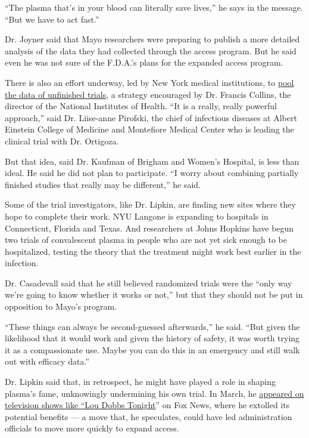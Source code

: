 ``The plasma that's in your blood can literally save lives,'' he says in
the message. ``But we have to act fast.''

Dr. Joyner said that Mayo researchers were preparing to publish a more
detailed analysis of the data they had collected through the access
program. But he said even he was not sure of the F.D.A.'s plans for the
expanded access program.

There is also an effort underway, led by New York medical institutions,
to
\href{https://med.nyu.edu/departments-institutes/population-health/divisions-sections-centers/biostatistics/research/continuous-monitoring-pooled-international-trials-convalescent-plasma-covid19-hospitalized-patients}{pool
the data of unfinished trials}, a strategy encouraged by Dr. Francis
Collins, the director of the National Institutes of Health. ``It is a
really, really powerful approach,'' said Dr. Liise-anne Pirofski, the
chief of infectious diseases at Albert Einstein College of Medicine and
Montefiore Medical Center who is leading the clinical trial with Dr.
Ortigoza.

But that idea, said Dr. Kaufman of Brigham and Women's Hospital, is less
than ideal. He said he did not plan to participate. ``I worry about
combining partially finished studies that really may be different,'' he
said.

Some of the trial investigators, like Dr. Lipkin, are finding new sites
where they hope to complete their work. NYU Langone is expanding to
hospitals in Connecticut, Florida and Texas. And researchers at Johns
Hopkins have begun two trials of convalescent plasma in people who are
not yet sick enough to be hospitalized, testing the theory that the
treatment might work best earlier in the infection.

Dr. Casadevall said that he still believed randomized trials were the
``only way we're going to know whether it works or not,'' but that they
should not be put in opposition to Mayo's program.

``These things can always be second-guessed afterwards,'' he said. ``But
given the likelihood that it would work and given the history of safety,
it was worth trying it as a compassionate use. Maybe you can do this in
an emergency and still walk out with efficacy data.''

Dr. Lipkin said that, in retrospect, he might have played a role in
shaping plasma's fame, unknowingly undermining his own trial. In March,
he
\href{https://twitter.com/loudobbs/status/1237892870331191297?lang=en}{appeared
on television shows like ``Lou Dobbs Tonight}'' on Fox News, where he
extolled its potential benefits --- a move that, he speculates, could
have led administration officials to move more quickly to expand access.

